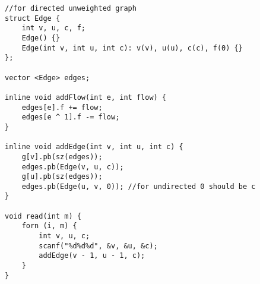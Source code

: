 \begin{verbatim}
//for directed unweighted graph
struct Edge {
	int v, u, c, f;
	Edge() {}
	Edge(int v, int u, int c): v(v), u(u), c(c), f(0) {}
};

vector <Edge> edges;

inline void addFlow(int e, int flow) {
 	edges[e].f += flow;
 	edges[e ^ 1].f -= flow;
}

inline void addEdge(int v, int u, int c) {
	g[v].pb(sz(edges));
	edges.pb(Edge(v, u, c));
	g[u].pb(sz(edges));
	edges.pb(Edge(u, v, 0)); //for undirected 0 should be c
}

void read(int m) {
 	forn (i, m) {
 	 	int v, u, c;
 	 	scanf("%d%d%d", &v, &u, &c);
 	 	addEdge(v - 1, u - 1, c);
 	}
}
\end{verbatim}
